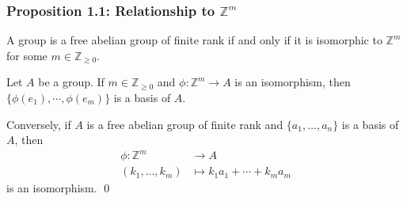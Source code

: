 \documentclass{article}
\renewenvironment{proof}{{\bfseries\color{blue1} Proof:}}{\qed}
\begin{document}
\subsubsection{Proposition 1.1: Relationship to $\mathbb{Z}^m$}
\begin{idea}
    A group is a free abelian group of finite rank if and only if it is isomorphic to $\mathbb{Z}^m$ for some $m\in \mathbb{Z}_{\ge 0}$.
\end{idea}
\begin{proof}
    Let $A$ be a group. If $m\in \mathbb{Z}_{\ge 0}$ and $\phi: \mathbb{Z}^m\rightarrow A$ is an isomorphism, then $\{\phi(e_1),\cdots,\phi(e_m)\}$ is a basis of $A$.

    Conversely, if $A$ is a free abelian group of finite rank and $\{a_1,\dots,a_n\}$ is a basis of $A$, then
    \begin{align*}
        \phi: \mathbb{Z}^m &\rightarrow A \\ 
        (k_1,\dots,k_m) & \mapsto k_1a_1 + \cdots + k_ma_m
    \end{align*}
    is an isomorphism.
\end{proof}
\end{document}
